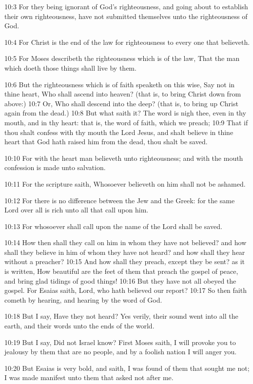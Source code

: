 10:3 For they being ignorant of God's righteousness, and going about to establish their own righteousness, have not submitted themselves unto the righteousness of God.

10:4 For Christ is the end of the law for righteousness to every one that believeth.

10:5 For Moses describeth the righteousness which is of the law, That the man which doeth those things shall live by them.

10:6 But the righteousness which is of faith speaketh on this wise, Say not in thine heart, Who shall ascend into heaven? (that is, to bring Christ down from above:) 10:7 Or, Who shall descend into the deep? (that is, to bring up Christ again from the dead.)  10:8 But what saith it? The word is nigh thee, even in thy mouth, and in thy heart: that is, the word of faith, which we preach; 10:9 That if thou shalt confess with thy mouth the Lord Jesus, and shalt believe in thine heart that God hath raised him from the dead, thou shalt be saved.

10:10 For with the heart man believeth unto righteousness; and with the mouth confession is made unto salvation.

10:11 For the scripture saith, Whosoever believeth on him shall not be ashamed.

10:12 For there is no difference between the Jew and the Greek: for the same Lord over all is rich unto all that call upon him.

10:13 For whosoever shall call upon the name of the Lord shall be saved.

10:14 How then shall they call on him in whom they have not believed?  and how shall they believe in him of whom they have not heard? and how shall they hear without a preacher?  10:15 And how shall they preach, except they be sent? as it is written, How beautiful are the feet of them that preach the gospel of peace, and bring glad tidings of good things!  10:16 But they have not all obeyed the gospel. For Esaias saith, Lord, who hath believed our report?  10:17 So then faith cometh by hearing, and hearing by the word of God.

10:18 But I say, Have they not heard? Yes verily, their sound went into all the earth, and their words unto the ends of the world.

10:19 But I say, Did not Israel know? First Moses saith, I will provoke you to jealousy by them that are no people, and by a foolish nation I will anger you.

10:20 But Esaias is very bold, and saith, I was found of them that sought me not; I was made manifest unto them that asked not after me.

